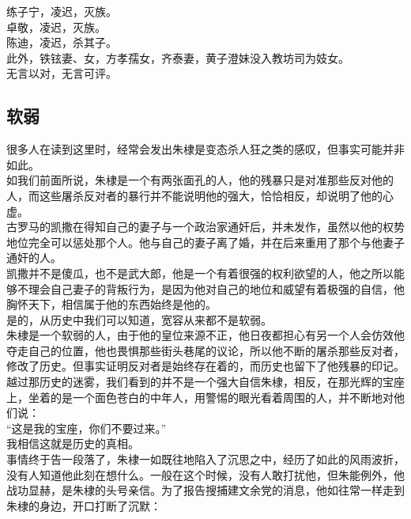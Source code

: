 \begin{multicols}{\theparacolNo}
练子宁，凌迟，灭族。\\

卓敬，凌迟，灭族。\\

陈迪，凌迟，杀其子。\\

此外，铁铉妻、女，方孝孺女，齐泰妻，黄子澄妹没入教坊司为妓女。\\

无言以对，无言可评。\\

\subsection{软弱}
很多人在读到这里时，经常会发出朱棣是变态杀人狂之类的感叹，但事实可能并非如此。\\

如我们前面所说，朱棣是一个有两张面孔的人，他的残暴只是对准那些反对他的人，而这些屠杀反对者的暴行并不能说明他的强大，恰恰相反，却说明了他的心虚。\\

古罗马的凯撒在得知自己的妻子与一个政治家通奸后，并未发作，虽然以他的权势地位完全可以惩处那个人。他与自己的妻子离了婚，并在后来重用了那个与他妻子通奸的人。\\

凯撒并不是傻瓜，也不是武大郎，他是一个有着很强的权利欲望的人，他之所以能够不理会自己妻子的背叛行为，是因为他对自己的地位和威望有着极强的自信，他胸怀天下，相信属于他的东西始终是他的。\\

是的，从历史中我们可以知道，宽容从来都不是软弱。\\

朱棣是一个软弱的人，由于他的皇位来源不正，他日夜都担心有另一个人会仿效他夺走自己的位置，他也畏惧那些街头巷尾的议论，所以他不断的屠杀那些反对者，修改了历史。但事实证明反对者是始终存在着的，而历史也留下了他残暴的印记。\\

越过那历史的迷雾，我们看到的并不是一个强大自信朱棣，相反，在那光辉的宝座上，坐着的是一个面色苍白的中年人，用警惕的眼光看着周围的人，并不断地对他们说：\\

“这是我的宝座，你们不要过来。”\\

我相信这就是历史的真相。\\

事情终于告一段落了，朱棣一如既往地陷入了沉思之中，经历了如此的风雨波折，没有人知道他此刻在想什么。一般在这个时候，没有人敢打扰他，但朱能例外，他战功显赫，是朱棣的头号亲信。为了报告搜捕建文余党的消息，他如往常一样走到朱棣的身边，开口打断了沉默：\\


\end{multicols}
